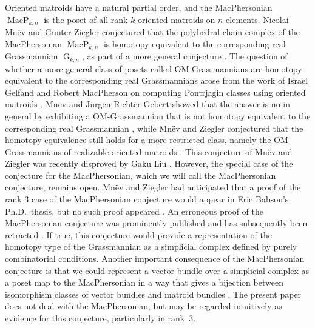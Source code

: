 \documentclass[11pt]{article}
\numberwithin{equation}{section}
\theoremstyle{remark}
\DeclareMathOperator{\g}{G}
\DeclareMathOperator{\mcp}{MacP}
\begin{document}
Oriented matroids have a natural partial order, and the MacPhersonian $\mcp_{k,n}$ is the poset of all rank $k$ oriented matroids on $n$ elements.
Nicolai Mnëv and Günter Ziegler conjectured that the polyhedral chain complex of the MacPhersonian $\mcp_{k,n}$ is homotopy equivalent to the corresponding real Grassmannian $\g_{k,n}$, as part of a more general conjecture \cite{mnev1993combinatorial}.
The question of whether a more general class of posets called OM-Grassmannians are homotopy equivalent to the corresponding real Grassmannians
arose from the work of Israel Gelfand and Robert MacPherson on computing Pontrjagin classes using oriented matroids \cite{gelfand1992combinatorial}.
Mnëv and Jürgen Richter-Gebert showed that the answer is no in general by exhibiting a OM-Grassmannian that is not homotopy equivalent to the corresponding real Grassmannian \cite{mnev1993two}, while
Mnëv and Ziegler conjectured that the homotopy equivalence still holds for a more restricted class, namely the OM-Grassmannians of realizable oriented matroids \cite{mnev1993combinatorial}.
This conjecture of Mnëv and Ziegler was recently
disproved by Gaku Liu \cite{liu2020counterexample}.
However, the special case of the conjecture for the MacPhersonian, which we will call the MacPhersonian conjecture, remains open.
Mnëv and Ziegler had anticipated that a proof of the rank $3$ case of the MacPhersonian conjecture would appear in Eric Babson's Ph.D.\ thesis, but no such proof appeared \cite{mnev1993combinatorial,babson1993combinatorial}.
An erroneous proof of the MacPhersonian conjecture was prominently published and has subsequently been retracted \cite{biss2003homotopy,biss2009erratum}.
If true, this conjecture would provide a representation of the homotopy type of the Grassmannian as a simplicial complex defined by purely combinatorial conditions.
Another important consequence of the MacPhersonian conjecture is that we could represent a vector bundle over a simplicial complex as a poset map to the MacPhersonian in a way that gives a bijection between isomorphism classes of vector bundles and matroid bundles \cite{anderson2002mod,anderson1999matroid}.
The present paper does not deal with the MacPhersonian, but may be regarded intuitively as evidence for this conjecture, particularly in rank~$3$.
\end{document}
